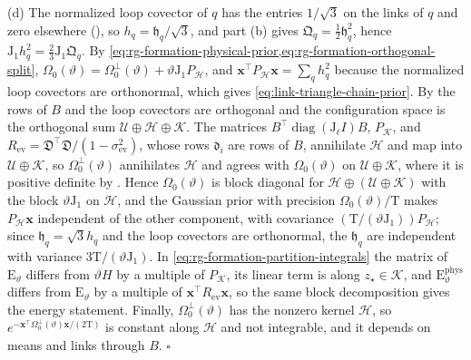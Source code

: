 (d) The normalized loop covector of $q$ has the entries $1/\sqrt3$ on the links of $q$ and zero
elsewhere (), so $h_q=\mathfrak h_q/\sqrt3$, and part (b) gives
$\mathfrak Q_q=\tfrac12\mathfrak h_q^2$, hence $\mathrm J_1h_q^2=\tfrac23\mathrm J_1\mathfrak Q_q$. By
\cref{eq:rg-formation-physical-prior,eq:rg-formation-orthogonal-split},
$\Omega_0(\vartheta)=\Omega^\perp_0(\vartheta)+\vartheta\mathrm J_1P_{\mathcal H}$,
and $\mathbf x^\top P_{\mathcal H}\mathbf x=\sum_qh_q^2$ because the normalized loop covectors are
orthonormal, which gives \cref{eq:link-triangle-chain-prior}. By  the rows
of $B$ and the loop covectors are orthogonal and the configuration space is the orthogonal sum
$\mathcal U\oplus\mathcal H\oplus\mathcal K$. The matrices $B^\top\operatorname{diag}(\mathrm J_\ell I)B$,
$P_{\mathcal K}$, and $R_{\mathrm{ev}}=\mathfrak D^\top\mathfrak D/(1-\sigma^2_{\mathrm{ev}})$, whose rows
$\mathfrak d_i$ are rows of $B$, annihilate $\mathcal H$ and map into $\mathcal U\oplus\mathcal K$, so
$\Omega^\perp_0(\vartheta)$ annihilates $\mathcal H$ and agrees with $\Omega_0(\vartheta)$ on
$\mathcal U\oplus\mathcal K$, where it is positive definite by
. Hence $\Omega_0(\vartheta)$ is block diagonal for
$\mathcal H\oplus(\mathcal U\oplus\mathcal K)$ with the block $\vartheta\mathrm J_1$ on $\mathcal H$, and
the Gaussian prior with precision $\Omega_0(\vartheta)/\mathrm T$ makes $P_{\mathcal H}\mathbf x$
independent of the other component, with covariance $(\mathrm T/(\vartheta\mathrm J_1))P_{\mathcal H}$;
since $\mathfrak h_q=\sqrt3h_q$ and the loop covectors are orthonormal, the $\mathfrak h_q$ are independent
with variance $3\mathrm T/(\vartheta\mathrm J_1)$. In \cref{eq:rg-formation-partition-integrals} the
matrix of $\mathrm E_\vartheta$ differs from $\vartheta H$ by a multiple of $P_{\mathcal K}$, its linear
term is along $z_\star\in\mathcal K$, and $\mathrm E^{\mathrm{phys}}_\vartheta$ differs from
$\mathrm E_\vartheta$ by a multiple of $\mathbf x^\top R_{\mathrm{ev}}\mathbf x$, so the same block
decomposition gives the energy statement. Finally, $\Omega^\perp_0(\vartheta)$ has the nonzero kernel
$\mathcal H$, so $e^{-\mathbf x^\top\Omega^\perp_0(\vartheta)\mathbf x/(2\mathrm T)}$ is constant along
$\mathcal H$ and not integrable, and it depends on means and links through $B$. \hfill$\square$

